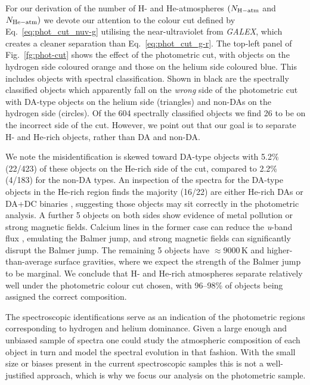\documentclass[a4paper,fleqn,usenatbib]{mnras}
\begin{document}
For our derivation of the number of H- and He-atmospheres $(N_{\rm H-atm}$ and $N_{\rm He-atm})$ we devote our attention to the colour cut defined by Eq.~\eqref{eq:phot_cut_nuv-g} utilising the near-ultraviolet from {\it GALEX}, which creates a cleaner separation than Eq.~\eqref{eq:phot_cut_g-r}. The top-left panel of Fig.~\ref{fg:phot-cut} shows the effect of the photometric cut, with objects on the hydrogen side coloured orange and those on the helium side coloured blue. This includes objects with spectral classification. Shown in black are the spectrally classified objects which apparently fall on the {\it wrong} side of the photometric cut with DA-type objects on the helium side (triangles) and non-DAs on the hydrogen side (circles). Of the 604 spectrally classified objects we find 26 to be on the incorrect side of the cut. However, we point out that our goal is to separate H- and He-rich objects, rather than DA and non-DA.

We note the misidentification is skewed toward DA-type objects with 5.2\% (22/423) of these objects on the He-rich side of the cut, compared to 2.2\% (4/183) for the non-DA types. An inspection of the spectra for the DA-type objects in the He-rich region finds the majority (16/22) are either He-rich DAs or DA+DC binaries \citep{rolland18,kepler19}, suggesting those objects may sit correctly in the photometric analysis. A further 5 objects on both sides show evidence of metal pollution or strong magnetic fields. Calcium lines in the former case can reduce the {\it u}-band flux \citep{hollands17}, emulating the Balmer jump, and strong magnetic fields can significantly disrupt the Balmer jump. The remaining 5 objects have \teff$\approx 9000$\,K and higher-than-average surface gravities, where we expect the strength of the Balmer jump to be marginal. We conclude that H- and He-rich atmospheres separate relatively well under the photometric colour cut chosen, with 96--98\% of objects being assigned the correct composition.

The spectroscopic identifications serve as an indication of the photometric regions corresponding to hydrogen and helium dominance. Given a large enough and unbiased sample of spectra one could study the atmospheric composition of each object in turn and model the spectral evolution in that fashion. With the small size or biases present in the current spectroscopic samples this is not a well-justified approach, which is why we focus our analysis on the photometric sample.
\end{document}
